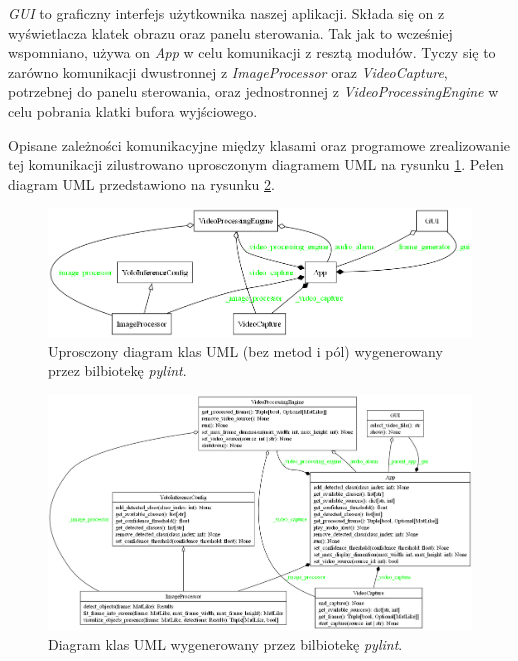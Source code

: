\emph{GUI} to graficzny interfejs użytkownika naszej aplikacji. Składa się on z wyświetlacza klatek obrazu oraz panelu sterowania. Tak jak to wcześniej wspomniano, używa on \emph{App} w celu komunikacji z resztą modułów. Tyczy się to zarówno komunikacji dwustronnej z \emph{ImageProcessor} oraz \emph{VideoCapture}, potrzebnej do panelu sterowania, oraz jednostronnej z \emph{VideoProcessingEngine} w celu pobrania klatki bufora wyjściowego.  

Opisane zależności komunikacyjne między klasami oraz programowe zrealizowanie tej komunikacji zilustrowano uprosczonym diagramem UML na rysunku \ref{fig:uprosczony-diagram-klas}. Pełen diagram UML przedstawiono na rysunku \ref{fig:diagram-klas}. 

\begin{figure}[H]
    \centering
    \includegraphics[width=\linewidth]{r_implementacja/klasy/simplified_classes.png}
    \caption{Uprosczony diagram klas UML (bez metod i pól) wygenerowany przez bilbiotekę \emph{pylint}.}
    \label{fig:uprosczony-diagram-klas}
\end{figure}


\begin{figure}[H]
    \centering
    \includegraphics[angle=270, scale = 0.5]{r_implementacja/klasy/classes_MyProject.png}
    \caption{Diagram klas UML wygenerowany przez bilbiotekę \emph{pylint}.}
    \label{fig:diagram-klas}
\end{figure}